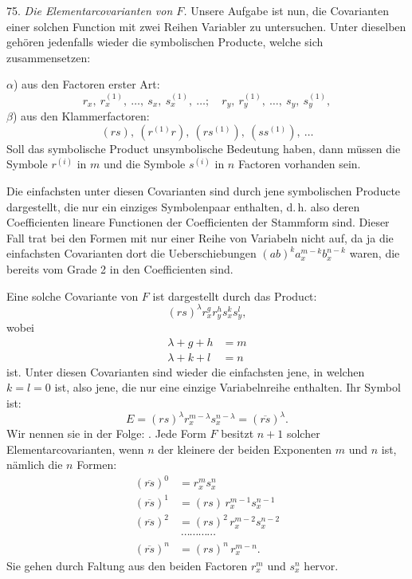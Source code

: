 \documentclass[11pt]{article}
\providecommand{\gesperrt}[1]{\textls[130]{#1}}
\providecommand{\weberpage}[1]{}
\providecommand{\weq}[2]{\begin{equation}\tag{#1}#2\end{equation}}
\begin{document}
\weberpage{80}
75. \textit{Die Elementarcovarianten von $F$.} Unsere Aufgabe ist nun, die Covarianten einer solchen Function mit zwei Reihen Variabler zu untersuchen. Unter dieselben gehören jedenfalls wieder die symbolischen Producte, welche sich zusammensetzen:

$\alpha$) aus den Factoren erster Art:
\[
r_x,\ r_x^{(1)},\ \dots,\ s_x,\ s_x^{(1)},\ \dots;\quad r_y,\ r_y^{(1)},\ \dots,\ s_y,\ s_y^{(1)},
\]
$\beta$) aus den Klammerfactoren:
\[
(rs),\ (r^{(1)}r),\ (rs^{(1)}),\ (ss^{(1)}),\ \dots
\]
Soll das symbolische Product unsymbolische Bedeutung haben, dann müssen die Symbole $r^{(i)}$ in $m$ und die Symbole $s^{(i)}$ in $n$ Factoren vorhanden sein.

Die einfachsten unter diesen Covarianten sind durch jene symbolischen Producte dargestellt, die nur ein einziges Symbolenpaar enthalten, d.\,h. also deren Coefficienten lineare Functionen der Coefficienten der Stammform sind. Dieser Fall trat bei den Formen mit nur einer Reihe von Variabeln nicht auf, da ja die einfachsten Covarianten dort die Ueberschiebungen $(ab)^k a_x^{m-k}b_x^{n-k}$ waren, die bereits vom Grade 2 in den Coefficienten sind.

Eine solche Covariante von $F$ ist dargestellt durch das Product:
\weq{4}{(rs)^\lambda r_x^g r_y^h s_x^k s_y^l,}
wobei
\[
\begin{aligned}
\lambda+g+h&=m\\
\lambda+k+l&=n
\end{aligned}
\]
ist. Unter diesen Covarianten sind wieder die einfachsten jene, in welchen $k=l=0$ ist, also jene, die nur eine einzige Variabelnreihe enthalten. Ihr Symbol ist:
\[
E=(rs)^\lambda r_x^{m-\lambda}s_x^{n-\lambda}=(\overline{rs})^\lambda.
\]
Wir nennen sie in der Folge: \gesperrt{Elementarcovarianten der Form $F$}. Jede Form $F$ besitzt $n+1$ solcher Elementarcovarianten, wenn $n$ der kleinere der beiden Exponenten $m$ und $n$ ist, nämlich die $n$ Formen:
\[
\begin{aligned}
(\overline{rs})^0&=r_x^m s_x^n\\
(\overline{rs})^1&=(rs)\,r_x^{m-1}s_x^{n-1}\\
(\overline{rs})^2&=(rs)^2\,r_x^{m-2}s_x^{n-2}\\
&\ \cdots\cdots\cdots\cdots\\
(\overline{rs})^n&=(rs)^n\,r_x^{m-n}.
\end{aligned}
\]
Sie gehen durch Faltung aus den beiden Factoren $r_x^m$ und $s_x^n$ hervor.
\end{document}
